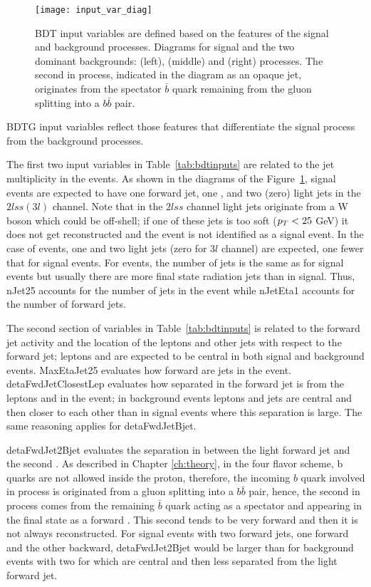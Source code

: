 \begin{figure} [!h]
 \centering
 \texttt{[image: input\_var\_diag]}
\caption[Diagrams for \tHq, \ttbar, and \ttW  processes.]{BDT input variables are defined based on the features of the signal and background processes. Diagrams for signal and the two dominant backgrounds: \tHq (left), \ttbar (middle) and \ttW (right) processes. The second \bjet in \tHq process, indicated in the diagram as an opaque jet, originates from the spectator $\bar{b}$ quark remaining from the gluon splitting into a $b\bar{b}$ pair.} 
\label{fig:input_vars_diag}
\end{figure}    

BDTG input variables reflect those features that differentiate the signal process from the background processes.

The first two input variables in Table~\ref{tab:bdtinputs} are related to the jet multiplicity in the events. As shown in the diagrams of the Figure~\ref{fig:input_vars_diag}, signal events are expected to have one forward jet, one \bjet, and two (zero) light jets in the $2lss(3l)$ channel. Note that in the $2lss$ channel light jets originate from a W boson which could be off-shell; if one of these jets is too soft ($p_T<25$ GeV) it does not get reconstructed and the event is not identified as a signal event. In the case of \ttbar events, one \bjet and two light jets (zero for $3l$ channel) are expected, one fewer that for signal events. For \ttW events, the number of jets is the same as for signal events but usually there are more final state radiation jets than in signal. Thus, nJet25 accounts for the number of jets in the event while nJetEta1 accounts for the number of forward jets.  
            
The second section of variables in Table~\ref{tab:bdtinputs} is related to the forward jet activity and the location of the leptons and other jets with respect to the forward jet; leptons and \bjets are expected to be central in both signal and background events. MaxEtaJet25 evaluates how forward are jets in the event. detaFwdJetClosestLep evaluates how separated in \etac the forward jet is from the leptons and \bjets in the event; in background events leptons and jets are central and then closer to each other than in signal events where this separation is large. The same reasoning applies for detaFwdJetBjet.

detaFwdJet2Bjet evaluates the separation in \etac between the light forward jet and the second \bjet. As described in Chapter \ref{ch:theory}, in the four flavor scheme, b quarks are not allowed inside the proton, therefore, the incoming $b$ quark involved in \tHq process is originated from a gluon splitting into a $b\bar{b}$ pair, hence, the second \bjet in \tHq process comes from the remaining $\bar{b}$ quark acting as a spectator and appearing in the final state as a forward \bjet. This second \bjet tends to be very forward and then it is not always reconstructed. For signal events with two forward jets, one forward and the other backward, detaFwdJet2Bjet would be larger than for background events with two \bjets for which \bjets are central and then less separated from the light forward jet. 


